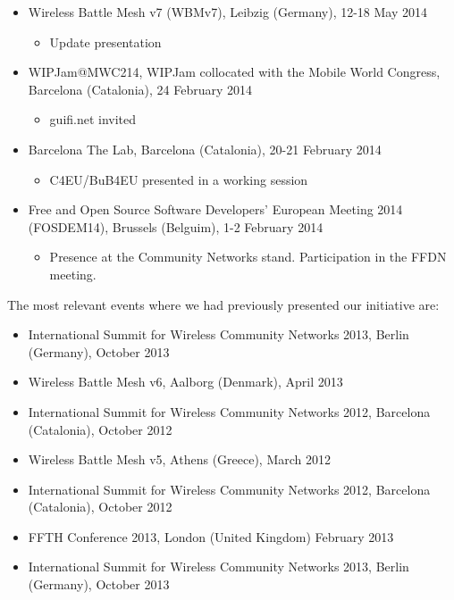 \begin{itemize}
  \item Wireless Battle Mesh v7 (WBMv7), Leibzig (Germany), 12-18 May 2014
  \begin{itemize} \setlength{\itemindent}{2em} \item Update presentation \end{itemize}
  
  \item WIPJam@MWC214, WIPJam collocated with the Mobile World Congress, Barcelona (Catalonia), 24 February 2014
  \begin{itemize} \setlength{\itemindent}{2em} \item guifi.net invited \end{itemize}
  
  \item Barcelona The Lab, Barcelona (Catalonia), 20-21 February 2014
  \begin{itemize} \setlength{\itemindent}{2em} \item C4EU/BuB4EU presented in a working session \end{itemize}
  
  \item Free and Open Source Software Developers' European Meeting 2014 (FOSDEM14), Brussels (Belguim), 1-2 February 2014
  \begin{itemize} \setlength{\itemindent}{2em} \item Presence at the Community Networks stand. Participation in the FFDN meeting. \end{itemize}
\end{itemize}



The most relevant events where we had previously presented our initiative are:
\begin{itemize}
  \setlength{\itemindent}{2em}
  \item International Summit for Wireless Community Networks 2013, Berlin (Germany), October 2013
  \item Wireless Battle Mesh v6, Aalborg (Denmark), April 2013
  \item International Summit for Wireless Community Networks 2012, Barcelona (Catalonia), October 2012
  \item Wireless Battle Mesh v5, Athens (Greece), March 2012
\end{itemize}

\begin{itemize}
  \item International Summit for Wireless Community Networks 2012, Barcelona (Catalonia), October 2012
  \item FFTH Conference 2013, London (United Kingdom) February 2013
  \item International Summit for Wireless Community Networks 2013, Berlin (Germany), October 2013
\end{itemize}

